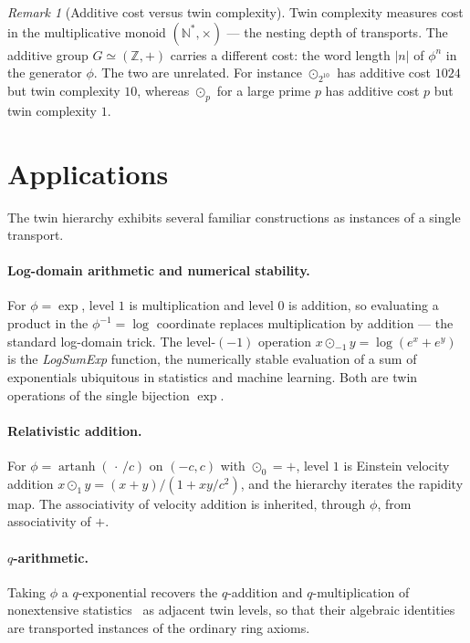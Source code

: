 \documentclass[11pt]{article}
\theoremstyle{definition}
\theoremstyle{remark}
\newtheorem{remark}[theorem]{Remark}
\newcommand{\Z}{\mathbb{Z}}
\newcommand{\N}{\mathbb{N}}
\begin{document}
	\begin{remark}[Additive cost versus twin complexity]
		Twin complexity measures cost in the multiplicative monoid $(\N^*,\times)$ --- the nesting depth of
		transports. The additive group $G\simeq(\Z,+)$ carries a different cost: the word length $|n|$ of
		$\phi^{n}$ in the generator $\phi$. The two are unrelated. For instance $\odot_{2^{10}}$ has additive
		cost $1024$ but twin complexity $10$, whereas $\odot_p$ for a large prime $p$ has additive cost $p$
		but twin complexity $1$.
	\end{remark}
	
	\section{Applications}

	The twin hierarchy exhibits several familiar constructions as instances of a single transport.

	\paragraph{Log-domain arithmetic and numerical stability.}
	For $\phi=\exp$, level $1$ is multiplication and level $0$ is addition, so evaluating a product in the
	$\phi^{-1}=\log$ coordinate replaces multiplication by addition --- the standard log-domain trick. The
	level-$(-1)$ operation $x\odot_{-1}y=\log(e^{x}+e^{y})$ is the \emph{LogSumExp} function, the
	numerically stable evaluation of a sum of exponentials ubiquitous in statistics and machine learning.
	Both are twin operations of the single bijection $\exp$.

	\paragraph{Relativistic addition.}
	For $\phi=\operatorname{artanh}(\,\cdot\,/c)$ on $(-c,c)$ with $\odot_0=+$, level $1$ is Einstein
	velocity addition $x\odot_1 y=(x+y)/(1+xy/c^{2})$, and the hierarchy iterates the rapidity map. The
	associativity of velocity addition is inherited, through $\phi$, from associativity of $+$.

	\paragraph{$q$-arithmetic.}
	Taking $\phi$ a $q$-exponential recovers the $q$-addition and $q$-multiplication of nonextensive
	statistics~\cite{tsallis2009} as adjacent twin levels, so that their algebraic identities are
	transported instances of the ordinary ring axioms.
\end{document}
